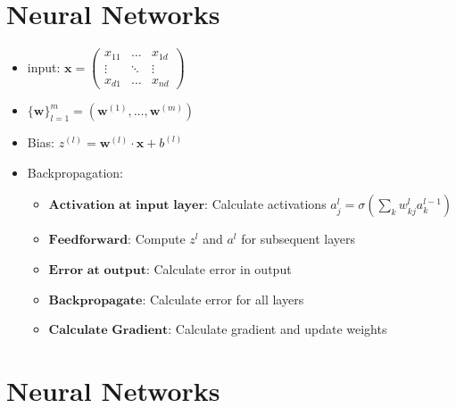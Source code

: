 \documentclass[11pt]{article}
\begin{document}
\newpage
\hypertarget{neural-networks}{%
\section*{Neural Networks}\label{neural-networks4}}

\begin{itemize}
    \item input: $\boldsymbol{x} = 
        \begin{pmatrix}
            x_{11} & \dots & x_{1d} \\
            \vdots & \ddots & \vdots \\
            x_{d1} & \dots & x_{nd}
        \end{pmatrix}$
    \item $\{\boldsymbol{w}\}^m_{l=1} = \left(\boldsymbol{w}^{(1)},\dots,\boldsymbol{w}^{(m)}\right)$
    \item Bias: $z^{(l)} = \boldsymbol{w}^{(l)}\cdot \boldsymbol{x} + b^{(l)}$
    \item Backpropagation:
        \begin{itemize}
            \item \(\textbf{Activation at input layer}\): Calculate activations $a^l_j = \sigma\left(\sum_k w^l_{kj}a^{l-1}_k\right)$
            \item \(\textbf{Feedforward}\): Compute $z^l$ and $a^l$ for subsequent layers
            \item \(\textbf{Error at output}\): Calculate error in output
            \item \(\textbf{Backpropagate}\): Calculate error for all layers 
            \item \(\textbf{Calculate Gradient}\): Calculate gradient and update weights
        \end{itemize}
\end{itemize}

\newpage
\hypertarget{neural-networks}{%
\section*{Neural Networks}\label{neural-networks5}}
\end{document}
